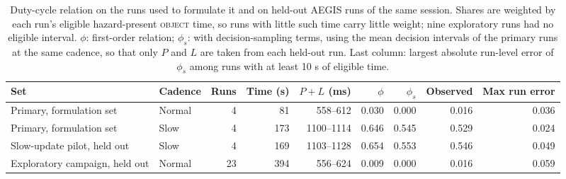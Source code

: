 \begin{table}[H]\centering\small
\caption{Duty-cycle relation on the runs used to formulate it and on held-out AEGIS runs of the same session. Shares are weighted by each run's eligible hazard-present \textsc{object} time, so runs with little such time carry little weight; nine exploratory runs had no eligible interval. $\phi$: first-order relation; $\phi_s$: with decision-sampling terms, using the mean decision intervals of the primary runs at the same cadence, so that only $P$ and $L$ are taken from each held-out run. Last column: largest absolute run-level error of $\phi_s$ among runs with at least 10 s of eligible time.}\label{tab:duty-holdout}
\begin{tabularx}{\linewidth}{>{\raggedright\arraybackslash}Xlrrrrrrr}
\toprule Set & Cadence & Runs & Time (s) & $P+L$ (ms) & $\phi$ & $\phi_s$ & Observed & Max run error\\ \midrule
Primary, formulation set & Normal & 4 & 81 & 558--612 & 0.030 & 0.000 & 0.016 & 0.036\\
Primary, formulation set & Slow & 4 & 173 & 1100--1114 & 0.646 & 0.545 & 0.529 & 0.024\\
Slow-update pilot, held out & Slow & 4 & 169 & 1103--1128 & 0.654 & 0.553 & 0.546 & 0.049\\
Exploratory campaign, held out & Normal & 23 & 394 & 556--624 & 0.009 & 0.000 & 0.016 & 0.059\\
\bottomrule
\end{tabularx}
\end{table}
